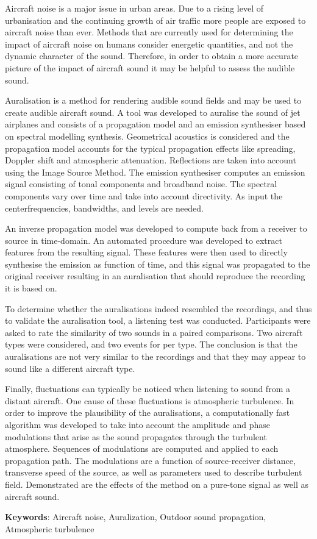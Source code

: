 Aircraft noise is a major issue in urban areas. Due to a rising level of
urbanisation and the continuing growth of air traffic more people are exposed to
aircraft noise than ever. Methods that are currently used for determining the
impact of aircraft noise on humans consider energetic quantities, and not the
dynamic character of the sound. Therefore, in order to obtain a more accurate
picture of the impact of aircraft sound it may be helpful to assess the audible
sound.

Auralisation is a method for rendering audible sound fields and may be used to
create audible aircraft sound. A tool was developed to auralise the sound of jet
airplanes and consists of a propagation model and an emission synthesiser based
on spectral modelling synthesis. Geometrical acoustics is considered and the
propagation model accounts for the typical propagation effects like spreading,
Doppler shift and atmospheric attenuation. Reflections are taken into account
using the Image Source Method.
The emission synthesiser computes an emission signal consisting of tonal
components and broadband noise. The spectral components vary over time and take
into account directivity. As input the centerfrequencies, bandwidths, and
levels are needed.

An inverse propagation model was developed to compute back from a receiver to
source in time-domain. An automated procedure was developed to extract features
from the resulting signal. These features were then used to directly synthesise
the emission as function of time, and this signal was propagated to the original
receiver resulting in an auralisation that should reproduce the recording
it is based on.

To determine whether the auralisations indeed resembled the recordings, and thus
to validate the auralisation tool, a listening test was conducted. Participants
were asked to rate the similarity of two sounds in a paired comparisons. Two
aircraft types were considered, and two events for per type.
The conclusion is that the auralisations are not very similar to the recordings
and that they may appear to sound like a different aircraft type.

Finally, fluctuations can typically be noticed when listening to sound from a
distant aircraft. One cause of these fluctuations is atmospheric turbulence. In
order to improve the plausibility of the auralisations, a
computationally fast algorithm was developed to take into account the amplitude
and phase modulations that arise as the sound propagates through the turbulent
atmosphere. Sequences of modulations are computed and applied to each
propagation path. The modulations are a function of source-receiver distance,
transverse speed of the source, as well as parameters used to describe turbulent
field. Demonstrated are the effects of the method on a
pure-tone signal as well as aircraft sound.



\vspace{0.1cm}

\textbf{Keywords}: Aircraft noise, Auralization, Outdoor sound propagation, Atmospheric turbulence
